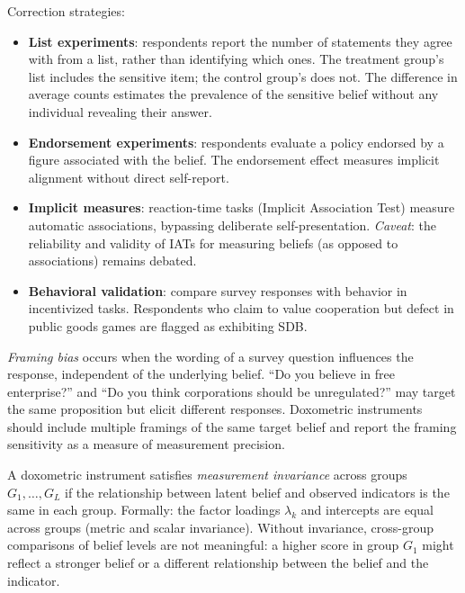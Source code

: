 Correction strategies:
\begin{itemize}[nosep]
  \item \textbf{List experiments}: respondents report the number of statements they agree with from a list, rather than identifying which ones.
  The treatment group's list includes the sensitive item; the control group's does not.
  The difference in average counts estimates the prevalence of the sensitive belief without any individual revealing their answer.
  \item \textbf{Endorsement experiments}: respondents evaluate a policy endorsed by a figure associated with the belief.
  The endorsement effect measures implicit alignment without direct self-report.
  \item \textbf{Implicit measures}: reaction-time tasks (Implicit Association Test) measure automatic associations, bypassing deliberate self-presentation.
  \textit{Caveat}: the reliability and validity of IATs for measuring beliefs (as opposed to associations) remains debated.
  \item \textbf{Behavioral validation}: compare survey responses with behavior in incentivized tasks.
  Respondents who claim to value cooperation but defect in public goods games are flagged as exhibiting SDB.
\end{itemize}

\begin{definition}
\label{def:framing-bias}
\emph{Framing bias} occurs when the wording of a survey question influences the response, independent of the underlying belief.
``Do you believe in free enterprise?'' and ``Do you think corporations should be unregulated?'' may target the same proposition but elicit different responses.
Doxometric instruments should include multiple framings of the same target belief and report the framing sensitivity as a measure of measurement precision.
\end{definition}

\begin{definition}
\label{def:invariance}
A doxometric instrument satisfies \emph{measurement invariance} across groups $G_1, \ldots, G_L$ if the relationship between latent belief and observed indicators is the same in each group.
Formally: the factor loadings $\lambda_k$ and intercepts are equal across groups (metric and scalar invariance).
Without invariance, cross-group comparisons of belief levels are not meaningful: a higher score in group $G_1$ might reflect a stronger belief or a different relationship between the belief and the indicator.
\end{definition}

